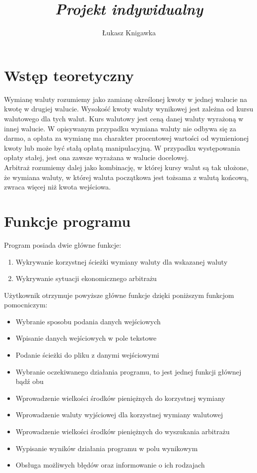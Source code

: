 \documentclass[a4paper,11pt]{article}
\title{ \sc{Specyfikacja funkcjonalna} \\
\emph{Projekt indywidualny} }
\author{Łukasz Knigawka}
\newcommand\tab[1][0.6cm]{\hspace*{#1}}
\begin{document}
\maketitle

\thispagestyle{empty}

\tableofcontents

\newpage

\section{Wstęp teoretyczny}

\tab Wymianę waluty rozumiemy jako zamianę określonej kwoty w jednej walucie na kwotę w drugiej walucie. Wysokość kwoty waluty wynikowej jest zależna od kursu walutowego dla tych walut. Kurs walutowy jest ceną danej waluty wyrażoną w innej walucie. W opisywanym przypadku wymiana waluty nie odbywa się za darmo, a opłata za wymianę ma charakter procentowej wartości od wymienionej kwoty lub może być stałą opłatą manipulacyjną. W przypadku występowania opłaty stałej, jest ona zawsze wyrażana w walucie docelowej.
\\\tab Arbitraż rozumiemy dalej jako kombinację, w której kursy walut są tak ułożone, że wymiana waluty, w której waluta początkowa jest tożsama z walutą końcową, zwraca więcej niż kwota wejściowa.

\section{Funkcje programu}

\tab Program posiada dwie główne funkcje:
\begin{enumerate}
\item Wykrywanie korzystnej ścieżki wymiany waluty dla wskazanej waluty
\item Wykrywanie sytuacji ekonomicznego arbitrażu
\end{enumerate}
\tab Użytkownik otrzymuje powyższe główne funkcje dzięki poniższym funkcjom pomocniczym:
\begin{itemize}
\item Wybranie sposobu podania danych wejściowych 
\item Wpisanie danych wejściowych w pole tekstowe 
\item Podanie ścieżki do pliku z danymi wejściowymi
\item Wybranie oczekiwanego działania programu, to jest jednej funkcji głównej bądź obu
\item Wprowadzenie wielkości środków pieniężnych do korzystnej wymiany
\item Wprowadzenie waluty wyjściowej dla korzystnej wymiany walutowej
\item Wprowadzenie wielkości środków pieniężnych do wyszukania arbitrażu
\item Wypisanie wyników działania programu w polu wynikowym
\item Obsługa możliwych błędów oraz informowanie o ich rodzajach
\end{itemize}
\end{document}
